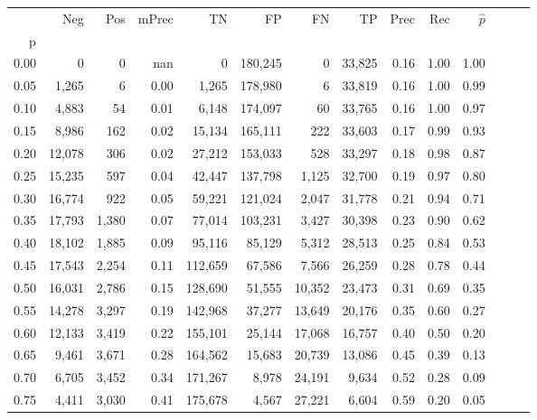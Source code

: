 \begin{tabular}{rrrrrrrrrrrrrr}
\toprule
{} &     Neg &    Pos & mPrec &       TN &       FP &      FN &      TP &  Prec &   Rec & $\hat{p}$ \\
p    &         &        &       &          &          &         &         &       &       &           \\
\midrule
0.00 &       0 &      0 &   nan &        0 &  180,245 &       0 &  33,825 &  0.16 &  1.00 &      1.00 \\
0.05 &   1,265 &      6 &  0.00 &    1,265 &  178,980 &       6 &  33,819 &  0.16 &  1.00 &      0.99 \\
0.10 &   4,883 &     54 &  0.01 &    6,148 &  174,097 &      60 &  33,765 &  0.16 &  1.00 &      0.97 \\
0.15 &   8,986 &    162 &  0.02 &   15,134 &  165,111 &     222 &  33,603 &  0.17 &  0.99 &      0.93 \\
0.20 &  12,078 &    306 &  0.02 &   27,212 &  153,033 &     528 &  33,297 &  0.18 &  0.98 &      0.87 \\
0.25 &  15,235 &    597 &  0.04 &   42,447 &  137,798 &   1,125 &  32,700 &  0.19 &  0.97 &      0.80 \\
0.30 &  16,774 &    922 &  0.05 &   59,221 &  121,024 &   2,047 &  31,778 &  0.21 &  0.94 &      0.71 \\
0.35 &  17,793 &  1,380 &  0.07 &   77,014 &  103,231 &   3,427 &  30,398 &  0.23 &  0.90 &      0.62 \\
0.40 &  18,102 &  1,885 &  0.09 &   95,116 &   85,129 &   5,312 &  28,513 &  0.25 &  0.84 &      0.53 \\
0.45 &  17,543 &  2,254 &  0.11 &  112,659 &   67,586 &   7,566 &  26,259 &  0.28 &  0.78 &      0.44 \\
0.50 &  16,031 &  2,786 &  0.15 &  128,690 &   51,555 &  10,352 &  23,473 &  0.31 &  0.69 &      0.35 \\
0.55 &  14,278 &  3,297 &  0.19 &  142,968 &   37,277 &  13,649 &  20,176 &  0.35 &  0.60 &      0.27 \\
0.60 &  12,133 &  3,419 &  0.22 &  155,101 &   25,144 &  17,068 &  16,757 &  0.40 &  0.50 &      0.20 \\
0.65 &   9,461 &  3,671 &  0.28 &  164,562 &   15,683 &  20,739 &  13,086 &  0.45 &  0.39 &      0.13 \\
0.70 &   6,705 &  3,452 &  0.34 &  171,267 &    8,978 &  24,191 &   9,634 &  0.52 &  0.28 &      0.09 \\
0.75 &   4,411 &  3,030 &  0.41 &  175,678 &    4,567 &  27,221 &   6,604 &  0.59 &  0.20 &      0.05 \\

\end{tabular}
